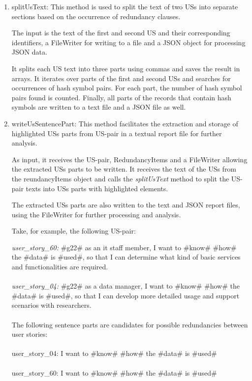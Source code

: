 \begin{enumerate}
	
	\item splitUsText: This method is used to split the text of two USs into separate sections based on the occurrence of redundancy clauses. 
	
	The input is the text of the first and second US and their corresponding identifiers, a FileWriter for writing to a file and a JSON object for processing JSON data. 
	
	It splits each US text into three parts using commas and saves the result in arrays. It iterates over parts of the first and second USs and searches for occurrences of hash symbol pairs. For each part, the number of hash symbol pairs found is counted. Finally, all parts of the records that contain hash symbols are written to a text file and a JSON file as well.
	
	\item writeUsSentencePart: This method facilitates the extraction and storage of highlighted USs parts from US-pair in a textual report file for further analysis.
	
	As input, it receives the US-pair, RedundancyItems and a FileWriter allowing the extracted USs parts to be written. It receives the text of the USs from the reundancyItems object and calls the \textit{splitUsText} method to split the US-pair texts into USs parts with highlighted elements.
	
	The extracted USs parts are also written to the text and JSON report files, using the FileWriter for further processing and analysis.
	
	\begin{example}
		Take, for example, the following US-pair:
		
		\textit{user\_story\_60:} \#g22\# as an it staff member, I want to \#know\# \#how\# the \#data\# is \#used\#, so that I can determine what kind of basic services and functionalities are required.\\\\
		\textit{user\_story\_04:} \#g22\# as a data manager, I want to \#know\# \#how\# the \#data\# is \#used\#, so that I can develop more detailed usage and support scenarios with researchers.\\\\
		The following sentence parts are candidates for possible redundancies between user stories:\\\\
		user\_story\_04:  I want to \#know\# \#how\# the \#data\# is \#used\#\\\\
		user\_story\_60:  I want to \#know\# \#how\# the \#data\# is \#used\#	
	\end{example}
\end{enumerate}
